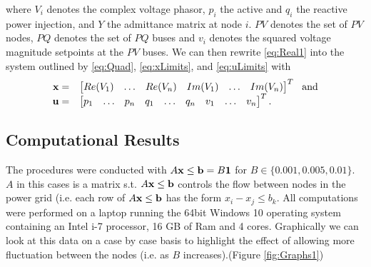 where $V_i$ denotes the complex voltage phasor, $p_i$ the active and $q_i$ the reactive power injection, and $Y$ the admittance matrix at node $i$. $PV$ denotes the set of $PV$ nodes, $PQ$ denotes the set of $PQ$ buses and $v_i$ denotes the squared voltage magnitude setpoints at the $PV$ buses. We can then rewrite \cref{eq:Real1} into the system outlined by \cref{eq:Quad}, \cref{eq:xLimits}, and \cref{eq:uLimits} with 
\[
\begin{array}{rl}
\mathbf{x}= & \begin{bmatrix} Re(V_1) & \dots & Re(V_n) & Im(V_1) & \dots  &  Im(V_n) \end{bmatrix}^T ~~\mbox{and} \\
\mathbf{u}=& \begin{bmatrix} p_1 &  \dots &  p_n &  q_1 &  \dots &  q_n &  v_1 &  \dots &  v_n \end{bmatrix}^T.
\end{array}
\]



\subsection{Computational Results} \label{ssec:compres}


The procedures were conducted with $A\mathbf{x} \leq \mathbf{b} = B \mathbf{1}$ for $B\in\{0.001, 0.005,0.01\}$.
$A$ in this cases is a matrix s.t. $A\mathbf{x} \leq \mathbf{b}$ controls the flow between nodes in the power grid (i.e. each row of $A\mathbf{x} \leq \mathbf{b}$ has the form $x_i-x_j\leq b_k$. 
All computations were performed on a laptop running the 64bit Windows 10 operating system containing an Intel i-7 processor, 16 GB of Ram and 4 cores. 
Graphically we can look at this data on a case by case basis to highlight the effect of allowing more fluctuation between the nodes (i.e. as $B$ increases).(Figure \ref{fig:Graphs1}) 

